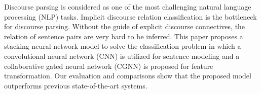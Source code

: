 Discourse parsing is considered as one of the most challenging natural language processing (NLP) tasks. Implicit discourse relation classification is the bottleneck for discourse parsing. Without the guide of explicit discourse connectives, the relation of sentence pairs are very hard to be inferred.  This paper proposes a stacking neural network model to solve the classification problem in which a convolutional neural network (CNN) is utilized for sentence modeling and a collaborative gated neural network (CGNN) is proposed for feature transformation. Our evaluation and comparisons show that the proposed model outperforms previous state-of-the-art systems.
